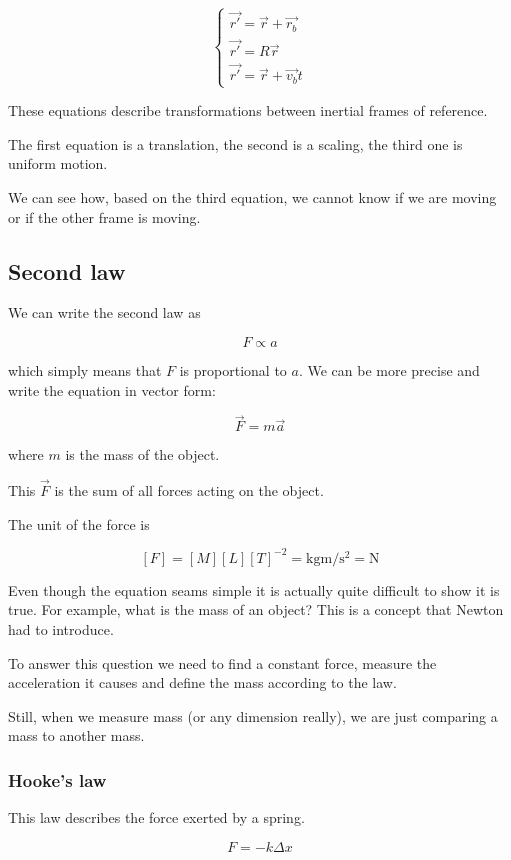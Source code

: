 \documentclass[10pt]{extarticle}
\begin{document}
$$
    \begin{cases}
        \vec {r'} = \vec r + \vec{r_b} \\
        \vec {r'} = R \vec r           \\
        \vec {r'} = \vec r + \vec{v_b} t
    \end{cases}
$$

These equations describe transformations between inertial frames of reference.

The first equation is a translation, the second is a scaling, the third one is uniform motion.

We can see how, based on the third equation, we cannot know if we are moving or if the other frame is moving.

\subsection{Second law}

We can write the second law as

$$
    F \propto a
$$

which simply means that $F$ is proportional to $a$.
We can be more precise and write the equation in vector form:

$$
    \vec F = m \vec a
$$

where $m$ is the mass of the object.

This $\vec F$ is the sum of all forces acting on the object.

The unit of the force is

$$
    [F] = [M][L][T]^{-2} = \si{\kilogram \meter \per \second \squared} = \si{\newton}
$$

Even though the equation seams simple it is actually quite difficult to show it is true.
For example, what is the mass of an object? This is a concept that Newton had to introduce.

To answer this question we need to find a constant force, measure the acceleration it causes and define the mass according to the law.

Still, when we measure mass (or any dimension really), we are just comparing a mass to another mass.

\subsubsection{Hooke's law}

This law describes the force exerted by a spring.

$$
    F = - k \Delta x
$$
\end{document}

